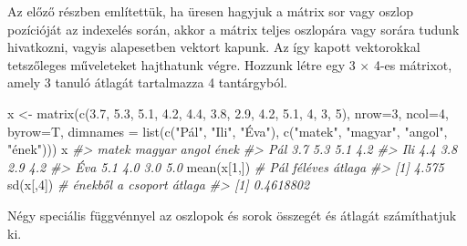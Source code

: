 \documentclass[
]{book}
\newenvironment{Shaded}{\begin{snugshade}}{\end{snugshade}}
\newcommand{\AttributeTok}[1]{\textcolor[rgb]{0.77,0.63,0.00}{#1}}
\newcommand{\CommentTok}[1]{\textcolor[rgb]{0.56,0.35,0.01}{\textit{#1}}}
\newcommand{\DecValTok}[1]{\textcolor[rgb]{0.00,0.00,0.81}{#1}}
\newcommand{\FloatTok}[1]{\textcolor[rgb]{0.00,0.00,0.81}{#1}}
\newcommand{\FunctionTok}[1]{\textcolor[rgb]{0.00,0.00,0.00}{#1}}
\newcommand{\NormalTok}[1]{#1}
\newcommand{\OtherTok}[1]{\textcolor[rgb]{0.56,0.35,0.01}{#1}}
\newcommand{\StringTok}[1]{\textcolor[rgb]{0.31,0.60,0.02}{#1}}
\begin{document}
Az előző részben említettük, ha üresen hagyjuk a mátrix sor vagy oszlop pozícióját az indexelés során, akkor a mátrix teljes oszlopára vagy sorára tudunk hivatkozni, vagyis alapesetben vektort kapunk. Az így kapott vektorokkal tetszőleges műveleteket hajthatunk végre. Hozzunk létre egy 3 \(\times\) 4-es mátrixot, amely 3 tanuló átlagát tartalmazza 4 tantárgyból.

\begin{Shaded}
\begin{Highlighting}[]
\NormalTok{x }\OtherTok{\textless{}{-}} \FunctionTok{matrix}\NormalTok{(}\FunctionTok{c}\NormalTok{(}\FloatTok{3.7}\NormalTok{, }\FloatTok{5.3}\NormalTok{, }\FloatTok{5.1}\NormalTok{, }\FloatTok{4.2}\NormalTok{, }\FloatTok{4.4}\NormalTok{, }\FloatTok{3.8}\NormalTok{, }\FloatTok{2.9}\NormalTok{, }\FloatTok{4.2}\NormalTok{, }\FloatTok{5.1}\NormalTok{, }\DecValTok{4}\NormalTok{, }\DecValTok{3}\NormalTok{, }\DecValTok{5}\NormalTok{), }
            \AttributeTok{nrow=}\DecValTok{3}\NormalTok{, }\AttributeTok{ncol=}\DecValTok{4}\NormalTok{, }\AttributeTok{byrow=}\NormalTok{T, }
            \AttributeTok{dimnames =} \FunctionTok{list}\NormalTok{(}\FunctionTok{c}\NormalTok{(}\StringTok{"Pál"}\NormalTok{, }\StringTok{"Ili"}\NormalTok{, }\StringTok{"Éva"}\NormalTok{),}
                            \FunctionTok{c}\NormalTok{(}\StringTok{"matek"}\NormalTok{, }\StringTok{"magyar"}\NormalTok{, }\StringTok{"angol"}\NormalTok{, }\StringTok{"ének"}\NormalTok{)))}
\NormalTok{x}
\CommentTok{\#\textgreater{}     matek magyar angol ének}
\CommentTok{\#\textgreater{} Pál   3.7    5.3   5.1  4.2}
\CommentTok{\#\textgreater{} Ili   4.4    3.8   2.9  4.2}
\CommentTok{\#\textgreater{} Éva   5.1    4.0   3.0  5.0}
\FunctionTok{mean}\NormalTok{(x[}\DecValTok{1}\NormalTok{,])      }\CommentTok{\# Pál féléves átlaga    }
\CommentTok{\#\textgreater{} [1] 4.575}
\FunctionTok{sd}\NormalTok{(x[,}\DecValTok{4}\NormalTok{])        }\CommentTok{\# énekből a csoport átlaga }
\CommentTok{\#\textgreater{} [1] 0.4618802}
\end{Highlighting}
\end{Shaded}

Négy speciális függvénnyel az oszlopok és sorok összegét és átlagát számíthatjuk ki.
\end{document}
